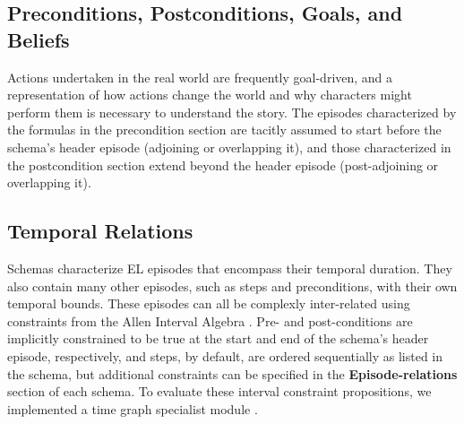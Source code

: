 

\subsection{Preconditions, Postconditions, Goals, and Beliefs}
\label{sec:preconds}
Actions undertaken in the real world are frequently goal-driven, and a representation of how actions change the world and why characters might perform them is necessary to understand the story. The episodes characterized by the formulas in the precondition section are tacitly assumed to start before the schema's header episode (adjoining or overlapping it), and those characterized in the postcondition section extend beyond the header episode (post-adjoining or overlapping it).

\subsection{Temporal Relations}
\label{sec:eprels}
Schemas characterize EL episodes that encompass their temporal duration. They also contain many other episodes, such as steps and preconditions, with their own temporal bounds. These episodes can all be complexly inter-related using constraints from the Allen Interval Algebra \citep{allen1983maintaining}. Pre- and post-conditions are implicitly constrained to be true at the start and end of the schema's header episode, respectively, and steps, by default, are ordered sequentially as listed in the schema, but additional constraints can be specified in the \textbf{Episode-relations} section of each schema. To evaluate these interval constraint propositions, we implemented a time graph specialist module \citep{gerevini1993efficient}.

